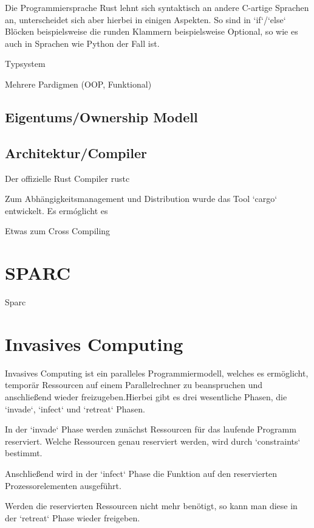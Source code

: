 Die Programmiersprache Rust lehnt sich syntaktisch an andere C-artige Sprachen an, unterscheidet sich aber hierbei in einigen
Aspekten. So sind in `if`/`else` Blöcken beispielsweise die runden Klammern beispielsweise Optional, so wie es auch in
Sprachen wie Python der Fall ist.

Typsystem

Mehrere Pardigmen (OOP, Funktional)

\subsection{Eigentums/Ownership Modell}

\subsection{Architektur/Compiler}

Der offizielle Rust Compiler rustc

Zum Abhängigkeitsmanagement und Distribution wurde das Tool `cargo` entwickelt. Es ermóglicht es 

Etwas zum Cross Compiling



\section{SPARC}

Sparc

\section{Invasives Computing}

Invasives Computing ist ein paralleles Programmiermodell, welches es ermöglicht, temporär Ressourcen auf einem Parallelrechner
zu beanspruchen und anschließend wieder freizugeben.Hierbei gibt es drei wesentliche Phasen, die `invade`, `infect` und `retreat` Phasen. 

In der `invade` Phase werden zunächst Ressourcen für das laufende Programm reserviert. Welche Ressourcen genau reserviert werden,
wird durch `constraints` bestimmt.

Anschließend wird in der `infect` Phase die Funktion auf den reservierten Prozessorelementen ausgeführt.

Werden die reservierten Ressourcen nicht mehr benötigt, so kann man diese in der `retreat` Phase wieder freigeben.
